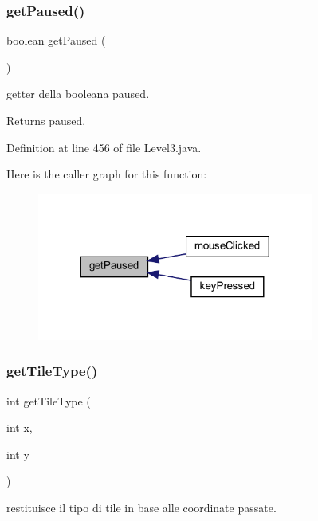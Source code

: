 \subsubsection{\texorpdfstring{get\+Paused()}{getPaused()}}
{\footnotesize\ttfamily boolean get\+Paused (\begin{DoxyParamCaption}{ }\end{DoxyParamCaption})}



getter della booleana paused. 

\begin{DoxyReturn}{Returns}
paused. 
\end{DoxyReturn}


Definition at line 456 of file Level3.\+java.

Here is the caller graph for this function\+:\nopagebreak
\begin{figure}[H]
\begin{center}
\leavevmode
\includegraphics[width=257pt]{classscenes_1_1_level3_af5e9f906de91e4d6400bb7f27cd563f3_icgraph}
\end{center}
\end{figure}
\mbox{\label{classscenes_1_1_level3_ac689e72523c8460ac3160526d310b1b7}} 
\subsubsection{\texorpdfstring{get\+Tile\+Type()}{getTileType()}}
{\footnotesize\ttfamily int get\+Tile\+Type (\begin{DoxyParamCaption}\item[{int}]{x,  }\item[{int}]{y }\end{DoxyParamCaption})}



restituisce il tipo di tile in base alle coordinate passate. 


